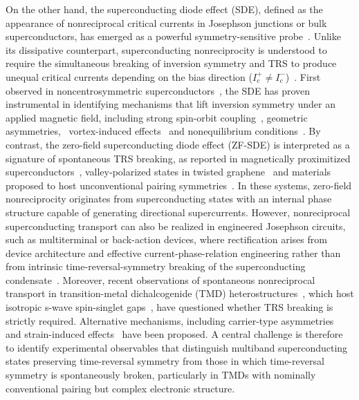 \documentclass[twocolumn,secnumarabic,amssymb, nobibnotes, aps, prl, superscriptaddress]{revtex4-2}
\begin{document}
On the other hand, the superconducting diode effect (SDE), defined as the appearance of nonreciprocal critical currents in Josephson junctions or bulk superconductors, has emerged as a powerful symmetry-sensitive probe~\cite{nad23,ma25}. Unlike its dissipative counterpart, superconducting nonreciprocity is understood to require the simultaneous breaking of inversion symmetry and TRS to produce unequal critical currents depending on the bias direction ($I_c^+\neq I_c^-$)~\cite{yua22,dav22,zha22,he22,pal22}.
First observed in noncentrosymmetric superconductors~\cite{wak17,and20,zha20}, the SDE has proven instrumental in identifying mechanisms that lift inversion symmetry under an applied magnetic field, including strong spin-orbit coupling~\cite{bau22,mar23,baur22,Costa2023,lot24}, geometric asymmetries,~\cite {baur22,lyu21A,hou23,cas25} vortex-induced effects~\cite{ gol22,mar23,Fukaya2025,gut23} and nonequilibrium conditions~\cite{mar23a,sha25}. By contrast, the zero-field superconducting diode effect (ZF-SDE) is interpreted as a signature of spontaneous TRS breaking, as reported in magnetically proximitized superconductors~\cite{Narita2022,tra23,jeo22,li25}, valley-polarized states in twisted graphene~\cite{lin22,mer23,Hu2023} and materials proposed to host unconventional pairing symmetries~\cite{Qiu2023,Le2024,zhao23,Qi2025,Anwar2023}. In these systems, zero-field nonreciprocity originates from superconducting states with an internal phase structure capable of generating directional supercurrents.
However, nonreciprocal superconducting transport can also be realized in engineered Josephson circuits, such as multiterminal or back-action devices, where rectification arises from device architecture and effective current-phase-relation engineering rather than from intrinsic time-reversal-symmetry breaking of the superconducting condensate~\cite{mar25,gup23,lup24}. Moreover, recent observations of spontaneous nonreciprocal transport in transition-metal dichalcogenide (TMD) heterostructures~\cite {Wu2022,24_chiral,liu24,Ma2025,chiral4Hb}, which host isotropic s-wave spin-singlet gaps~\cite{sim24}, have questioned whether TRS breaking is strictly required. Alternative mechanisms, including carrier-type asymmetries~\cite {Wu2022} and strain-induced effects~\cite{liu24,Ma2025} have been proposed. A central challenge is therefore to identify experimental observables that distinguish multiband superconducting states preserving time-reversal symmetry from those in which time-reversal symmetry is spontaneously broken, particularly in TMDs with nominally conventional pairing but complex electronic structure.
\end{document}
